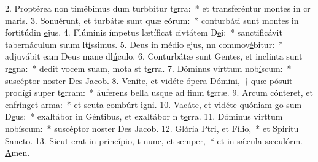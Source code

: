 2. Proptérea non timébimus dum turbbitur t\uline{e}rra:~* et transferéntur montes in cr m\uline{a}ris.
3. Sonuérunt, et turbátæ sunt quæ e\uline{ó}rum:~* conturbáti sunt montes in fortitúdin \uline{e}jus.
4. Flúminis ímpetus lætíficat civtátem D\uline{e}i:~* sanctificávit tabernáculum suum lt\uline{í}ssimus.
5. Deus in médio ejus, nn commov\uline{é}bitur:~* adjuvábit eam Deus mane dl\uline{ú}culo.
6. Conturbátæ sunt Gentes, et inclinta sunt r\uline{e}gna:~* dedit vocem suam, mota st t\uline{e}rra.
7. Dóminus virttum nob\uline{í}scum:~* suscéptor noster Des J\uline{a}cob.
8. Veníte, et vidéte ópera Dómini,~† quæ pósuit prodígi super t\uline{e}rram:~* áuferens bella usque ad finm t\uline{e}rræ.
9. Arcum cónteret, et cnfrínget \uline{a}rma:~* et scuta combúrt \uline{i}gni.
10. Vacáte, et vidéte quóniam go sum D\uline{e}us:~* exaltábor in Géntibus, et exaltábor n t\uline{e}rra.
11. Dóminus virttum nob\uline{í}scum:~* suscéptor noster Des J\uline{a}cob.
12. Glória Ptri, et F\uline{í}lio,~* et Spirítu S\uline{a}ncto.
13. Sicut erat in princípio, t nunc, et s\uline{e}mper,~* et in sǽcula sæculórm. \uline{A}men.
